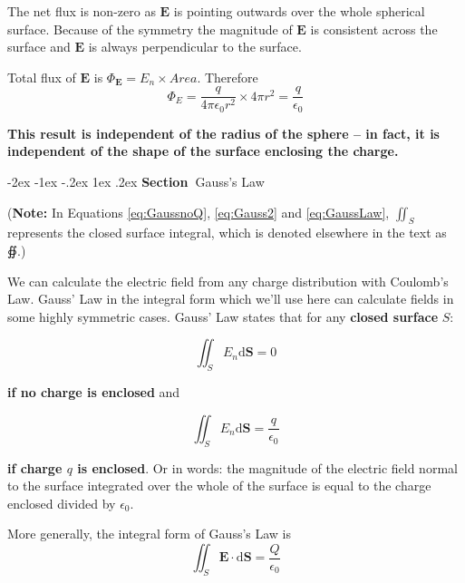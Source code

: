 \documentclass[
]{book}
\makeatletter
\renewcommand\section{%
\@startsection{section}{1}{\z@}%
              {-2ex \@plus -1ex \@minus -.2ex}%
              {1ex \@plus .2ex}%
              {\sffamily\bfseries\large\noindent Section~}}
\numberwithin{equation}{section}
\makeatother
\begin{document}
The net flux is non-zero as \(\mathbf{E}\) is pointing outwards over the whole
spherical surface. Because of the symmetry the magnitude of \(\mathbf{E}\) is
consistent across the surface and \(\mathbf{E}\) is always perpendicular to the
surface.

Total flux of \(\mathbf{E}\) is \(\Phi_{\mathbf{E}} = E_n \times Area\). Therefore
\begin{equation}
\label{eq:fluxE}
\Phi_E = \frac{q}{4\pi\epsilon_0 r^2} \times 4\pi r^2 = \frac{q}{\epsilon_0} 
\end{equation}

\textbf{This result is independent of the radius of the sphere -- in fact, it
is independent of the shape of the surface enclosing the charge.}

\hypertarget{gausss-law}{%
\section{Gauss's Law}\label{gausss-law}}

(\textbf{Note:} In Equations \eqref{eq:GaussnoQ}, \eqref{eq:Gauss2} and \eqref{eq:GaussLaw}, \(\iint_S\) represents the closed surface integral, which is denoted elsewhere in the text as ∯.)

We can calculate the electric field from any charge distribution with
Coulomb's Law. Gauss' Law in the integral form which we'll use here can
calculate fields in some highly symmetric cases. Gauss' Law states that
for any \textbf{closed surface} \(S\):

\begin{equation}
\label{eq:GaussnoQ}
\iint_S{E_n} \mathrm{d} \mathbf{S} = 0
\end{equation}

\textbf{if no charge is enclosed} and

\begin{equation}
\label{eq:Gauss2}
\iint_S{E_n} \mathrm{d} \mathbf{S} = \frac{q}{\epsilon_0}
\end{equation}

\textbf{if charge \(q\) is enclosed}. Or in words: the magnitude of the electric field normal to the surface
integrated over the whole of the surface is equal to the charge enclosed
divided by \(\epsilon_0\).

More generally, the integral form of Gauss's Law is
\begin{equation}
\label{eq:GaussLaw} 
\iint_S \mathbf{E} \cdot \mathrm{d} \mathbf{S} =\frac{Q}{\epsilon_0}
\end{equation}
\end{document}
